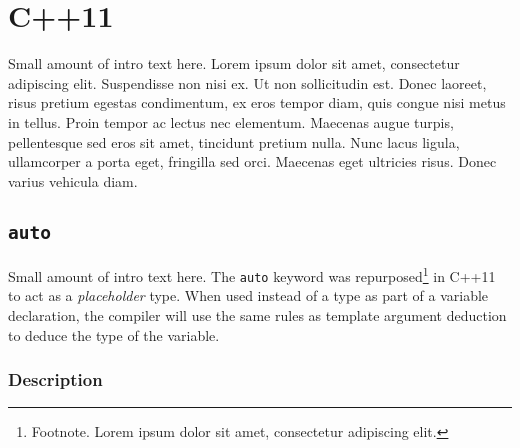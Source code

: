\documentclass[twoside,10pt,letterpaper,usenames]{newstyle-PearsonGeneric-7-38}
\author{}
\date{}
\newcommand{\passthrough}[1]{\lstset{mathescape=false}#1\lstset{mathescape=true}}
\begin{document}




% 






\hypertarget{c11}{%
\section{C++11}\label{c11}}

Small amount of intro text here. Lorem ipsum dolor sit amet, consectetur
adipiscing elit. Suspendisse non nisi ex. Ut non sollicitudin est. Donec
laoreet, risus pretium egestas condimentum, ex eros tempor diam, quis
congue nisi metus in tellus. Proin tempor ac lectus nec elementum.
Maecenas augue turpis, pellentesque sed eros sit amet, tincidunt pretium
nulla. Nunc lacus ligula, ullamcorper a porta eget, fringilla sed orci.
Maecenas eget ultricies risus. Donec varius vehicula diam.

\hypertarget{auto}{%
\subsection{\texorpdfstring{\texttt{auto}}{auto}}\label{auto}}

Small amount of intro text here. The \passthrough{\lstinline!auto!}
keyword was repurposed\footnote{Footnote. Lorem ipsum dolor sit amet,
  consectetur adipiscing elit.} in C++11 to act as a \emph{placeholder}
type. When used instead of a type as part of a variable declaration, the
{compiler} will use the same rules as {template argument deduction} to
deduce the type of the variable.

\hypertarget{description}{%
\subsubsection{Description}\label{description}}
\end{document}
